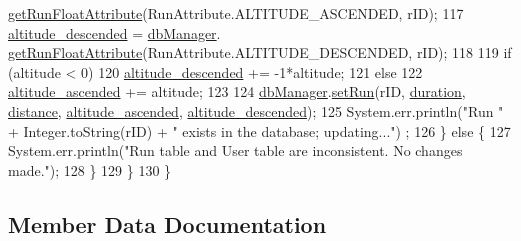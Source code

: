 \begin{DoxyCode}
      \mbox{\hyperlink{classcom_1_1activitytracker_1_1_d_b_manager_a666452f1e5862f90c06b0beb9a9fcfdd}{getRunFloatAttribute}}(RunAttribute.ALTITUDE\_ASCENDED, rID);
117                 \mbox{\hyperlink{classcom_1_1activitytracker_1_1_run_a26cd078680ee374482ce848b90308dda}{altitude\_descended}} = \mbox{\hyperlink{classcom_1_1activitytracker_1_1_run_ab90e32eda9f4c671ae3575f971edca6b}{dbManager}}.
      \mbox{\hyperlink{classcom_1_1activitytracker_1_1_d_b_manager_a666452f1e5862f90c06b0beb9a9fcfdd}{getRunFloatAttribute}}(RunAttribute.ALTITUDE\_DESCENDED, rID);
118 
119                 \textcolor{keywordflow}{if} (altitude < 0)
120                     \mbox{\hyperlink{classcom_1_1activitytracker_1_1_run_a26cd078680ee374482ce848b90308dda}{altitude\_descended}} += -1*altitude;
121                 \textcolor{keywordflow}{else}
122                     \mbox{\hyperlink{classcom_1_1activitytracker_1_1_run_a247fe29ef5dceeb25750fc7c2701f5c8}{altitude\_ascended}} += altitude;
123 
124                 \mbox{\hyperlink{classcom_1_1activitytracker_1_1_run_ab90e32eda9f4c671ae3575f971edca6b}{dbManager}}.\mbox{\hyperlink{classcom_1_1activitytracker_1_1_d_b_manager_a72282377a552ce4ce371abff02e312f2}{setRun}}(rID, \mbox{\hyperlink{classcom_1_1activitytracker_1_1_run_a5e38d293d29d4b65c9290ff4bee82e03}{duration}}, \mbox{\hyperlink{classcom_1_1activitytracker_1_1_run_a7b4ca8c4ecea4da1653f03b8c8fc16a8}{distance}}, 
      \mbox{\hyperlink{classcom_1_1activitytracker_1_1_run_a247fe29ef5dceeb25750fc7c2701f5c8}{altitude\_ascended}}, \mbox{\hyperlink{classcom_1_1activitytracker_1_1_run_a26cd078680ee374482ce848b90308dda}{altitude\_descended}});
125                 System.err.println(\textcolor{stringliteral}{"Run "} + Integer.toString(rID) + \textcolor{stringliteral}{" exists in the database; updating..."})
      ;
126             \} \textcolor{keywordflow}{else} \{
127                 System.err.println(\textcolor{stringliteral}{"Run table and User table are inconsistent. No changes made."});
128             \}
129         \}
130     \}
\end{DoxyCode}


\subsection{Member Data Documentation}
\mbox{\label{classcom_1_1activitytracker_1_1_run_a247fe29ef5dceeb25750fc7c2701f5c8}} 
